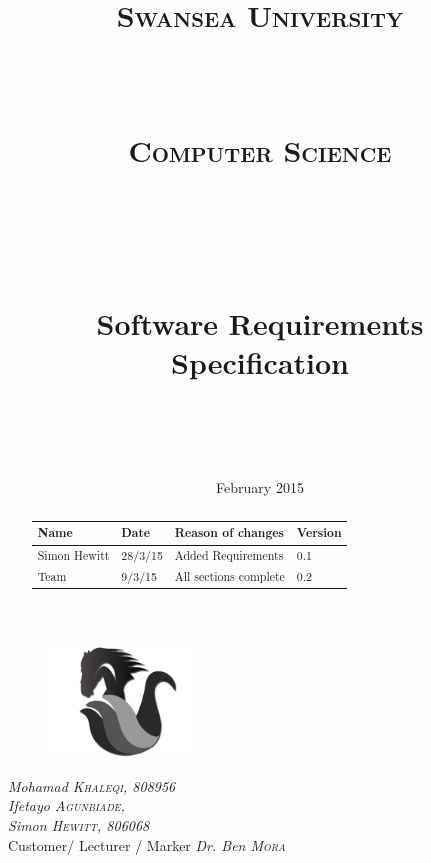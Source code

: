 \documentclass[a4paper,10pt]{article}
\title{
\normalfont \normalsize 
\begin{LARGE} \textsc{Swansea University} \end{LARGE} \\ [15pt] %
\begin{large} \textsc{Computer Science} \end{large} \\ [15pt] %
\vspace{50px}
\horrule{0.5pt} \\[0.4cm] %
\begin{Huge}Software Requirements Specification \end{Huge}%
\horrule{2pt} \\[0.5cm] %
}
\author{} %
\date{} %
\begin{document}
\begin{titlepage}
\begin{figure}
  \centering
	\includegraphics[width=4cm]{swantech_chess_logo}
\end{figure}
\maketitle
\vspace{50px}
\begin{flushleft}
  \textit{Mohamad \textsc{Khaleqi}, 808956} \\
  \textit{Ifetayo \textsc{Agunbiade}, } \\
 \textit{Simon \textsc{Hewitt}, 806068} \\
  \hfill Customer/ Lecturer / Marker \textit{Dr. Ben \textsc{Mora}}
\end{flushleft}
\vfill
\center \date{\normalsize February 2015} %

\end{titlepage}
\pagebreak


\tableofcontents
\pagebreak
\justify


\renewcommand{\abstractname}{Revision History}
\begin{abstract}
\begin{center}
  \begin{tabular}{ |  p{3cm} | p{3cm} |  p{5cm} | p{2cm} |}
    \hline
    Name & Date & Reason of changes & Version \\ \hline \hline
    Simon Hewitt & 28/3/15 & Added Requirements & 0.1 \\ \hline 
    Team & 9/3/15 & All sections complete & 0.2 \\
    \hline
  \end{tabular}
\end{center}
\end{abstract}
\end{document}
